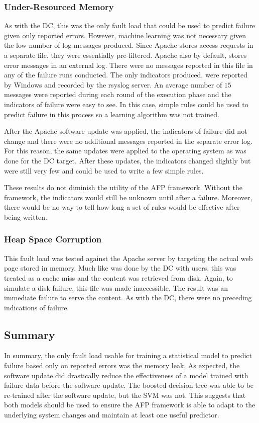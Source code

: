 \subsubsection{Under-Resourced Memory}
As with the \ac{DC}, this was the only fault load that could be used to predict
failure given only reported errors.  However, machine learning was not
necessary given the low number of log messages produced.  Since Apache stores
access requests in a separate file, they were essentially pre-filtered.  Apache
also by default, stores error messages in an external log.  There were no
messages reported in this file in any of the failure runs conducted.  The only
indicators produced, were reported by Windows and recorded by the rsyslog
server.  An average number of $15$ messages were reported during each round of
the execution phase and the indicators of failure were easy to see.  In this
case, simple rules could be used to predict failure in this process so a
learning algorithm was not trained.  

After the Apache software update was applied, the indicators of failure did not
change and there were no additional messages reported in the separate error
log.  For this reason, the same updates were applied to the operating system as
was done for the \ac{DC} target.  After these updates, the indicators changed
slightly but were still very few and could be used to write a few simple rules.

These results do not diminish the utility of the \ac{AFP} framework.  Without
the framework, the indicators would still be unknown until after a failure.
Moreover, there would be no way to tell how long a set of rules would be
effective after being written.

\subsubsection{Heap Space Corruption}
This fault load was tested against the Apache server by targeting the actual
web page stored in memory.  Much like was done by the \ac{DC} with users, this
was treated as a cache miss and the content was retrieved from disk.  Again, to
simulate a disk failure, this file was made inaccessible.  The result was an
immediate failure to serve the content.  As with the \ac{DC}, there were no
preceding indications of failure.

\subsection{Summary}
In summary, the only fault load usable for training a statistical model to
predict failure based only on reported errors was the memory leak.  As
expected, the software update did drastically reduce the effectiveness of a
model trained with failure data before the software update.  The boosted
decision tree was able to be re-trained after the software update, but the
\ac{SVM} was not.  This suggests that both models should be used to ensure the
\ac{AFP} framework is able to adapt to the underlying system changes and
maintain at least one useful predictor.
